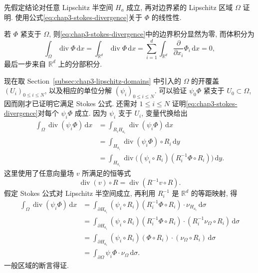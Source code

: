 \begin{Proof}
先假定结论对任意 Lipschitz 半空间 $H_a$ 成立, 再对边界紧的 Lipschitz 区域 $\Omega$ 证明. 使用公式\eqref{eq:chap3-stokes-divergence}关于 $\Phi$ 的线性性.

若 $\Phi$ 紧支于 $\Omega$, 则\eqref{eq:chap3-stokes-divergence}中的边界积分显然为零, 而体积分为
\[
 \int_\Omega\operatorname{div}\Phi\,\mathrm dx
 =\int_{\mathbb R^d}\operatorname{div}\Phi\,\mathrm dx
 =\sum_{i=1}^d\int_{\mathbb R^d}\frac{\partial}{\partial x_i}\Phi_i\,\mathrm dx=0,
\]
最后一步来自 $\mathbb R^d$ 上的分部积分.

现在取 Section~\ref{subsec:chap3-lipschitz-domains} 中引入的 $\Omega$ 的开覆盖 $(U_i)_{0\leq i\leq N}$, 以及相应的单位分解 $(\psi_i)_{0\leq i\leq N}$. 可以验证 $\psi_0\Phi$ 紧支于 $U_0\subset\Omega$, 因而刚才已证明它满足 Stokes 公式. 还需对 $1\leq i\leq N$ 证明\eqref{eq:chap3-stokes-divergence}对每个 $\psi_i\Phi$ 成立. 因为 $\psi_i$ 支于 $U_i$, 变量代换给出
\[
\begin{aligned}
 \int_\Omega\operatorname{div}(\psi_i\Phi)\,\mathrm dx
 &=\int_{R_iH_{a_i}}\operatorname{div}(\psi_i\Phi)\,\mathrm dx\\
 &=\int_{H_{a_i}}\operatorname{div}(\psi_i\Phi)\circ R_i\,\mathrm dy\\
 &=\int_{H_{a_i}}\operatorname{div}
 \bigl((\psi_i\circ R_i)(R_i^{-1}\Phi\circ R_i)\bigr)\,\mathrm dy.
\end{aligned}
\]
这里使用了任意向量场 $v$ 所满足的恒等式
\[
 \operatorname{div}(v)\circ R
 =\operatorname{div}(R^{-1}v\circ R).
\]
假定 Stokes 公式对 Lipschitz 半空间成立, 再利用 $R_i^{-1}$ 是 $\mathbb R^d$ 的等距映射, 得
\[
\begin{aligned}
 \int_\Omega\operatorname{div}(\psi_i\Phi)\,\mathrm dx
 &=\int_{\partial H_{a_i}}(\psi_i\circ R_i)
 (R_i^{-1}\Phi\circ R_i)\cdot\nu_{H_{a_i}}\,\mathrm d\sigma\\
 &=\int_{\partial H_{a_i}}(\psi_i\circ R_i)
 (R_i^{-1}\Phi\circ R_i)\cdot(R_i^{-1}\nu_\Omega\circ R_i)\,\mathrm d\sigma\\
 &=\int_{\partial H_{a_i}}(\psi_i\circ R_i)
 (\Phi\circ R_i)\cdot(\nu_\Omega\circ R_i)\,\mathrm d\sigma\\
 &=\int_{\partial\Omega}\psi_i\Phi\cdot\nu_\Omega\,\mathrm d\sigma.
\end{aligned}
\]
一般区域的断言得证.


\end{Proof}
